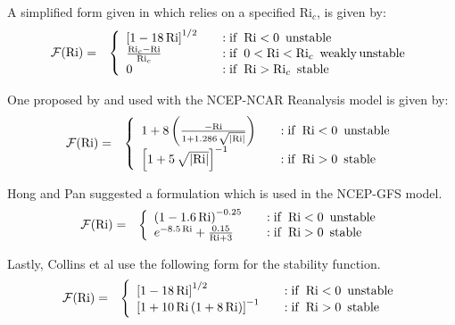 A simplified form given in \cite{Jacobson2005,Stull1988} which relies on a specified $\mathrm{Ri}_c$, is given by:
\begin{eqnarray}\label{VarDiff_Eq_F_Stull}
\mathcal{F}(\mathrm{Ri}) &=& \left\{ \begin{array} {l@{\quad \quad}l}
 \left[ 1 -18 \, \mathrm{Ri} \right]^{1/2}           &: \mathrm{if}\,\,\, \mathrm{Ri} < 0 \,\,\, \mathrm{unstable} \\
 \frac{\mathrm{Ri}_c-\mathrm{Ri}}{\mathrm{Ri}_c}     &: \mathrm{if}\,\,\, 0<\mathrm{Ri} < \mathrm{Ri}_c\,\,\, \mathrm{weakly \, unstable} \\
 0                                                   &: \mathrm{if}\,\,\, \mathrm{Ri} > \mathrm{Ri}_c \,\,\, \mathrm{stable}
\end{array}
\right.
\end{eqnarray}

One proposed by \cite{Betts1996} and used with the NCEP-NCAR Reanalysis model is given by:
\begin{eqnarray}\label{VarDiff_Eq_F_Betts}
\mathcal{F}(\mathrm{Ri}) &=& \left\{ \begin{array} {l@{\quad \quad}l}
 1 + 8 \left( \frac{- \mathrm{Ri}}{1+1.286 \, \sqrt{\left| \mathrm{Ri}\right|}} \right)  &: \mathrm{if}\,\,\, \mathrm{Ri} < 0 \,\,\, \mathrm{unstable} \\
 \left[ 1+ 5 \, \sqrt{\left| \mathrm{Ri}\right|} \right]^{-1}                            &: \mathrm{if}\,\,\, \mathrm{Ri} > 0 \,\,\, \mathrm{stable}
\end{array}
\right.
\end{eqnarray}

Hong and Pan \cite{Hong1996} suggested a formulation which is used in the NCEP-GFS model.
\begin{eqnarray}\label{VarDiff_Eq_F_Hong}
\mathcal{F}(\mathrm{Ri}) &=& \left\{ \begin{array} {l@{\quad \quad}l}
 \left(1 -1.6 \, \mathrm{Ri} \right)^{-0.25}                  &: \mathrm{if}\,\,\, \mathrm{Ri} < 0 \,\,\, \mathrm{unstable} \\
 e^{-8.5 \, \mathrm{Ri}} + \frac{0.15}{\mathrm{Ri} + 3}       &: \mathrm{if}\,\,\, \mathrm{Ri} > 0 \,\,\, \mathrm{stable}
\end{array}
\right.
\end{eqnarray}

Lastly, Collins et al \cite{Collins2004} use the following form for the stability function.
\begin{eqnarray}\label{VarDiff_Eq_F_Collins}
\mathcal{F}(\mathrm{Ri}) &=& \left\{ \begin{array} {l@{\quad \quad}l}
 \left[ 1 -18 \, \mathrm{Ri} \right]^{1/2}                         &: \mathrm{if}\,\,\, \mathrm{Ri} < 0 \,\,\, \mathrm{unstable} \\
 \left[ 1+ 10 \, \mathrm{Ri} \, (1+8 \, \mathrm{Ri}) \right]^{-1}  &: \mathrm{if}\,\,\, \mathrm{Ri} > 0 \,\,\, \mathrm{stable}
\end{array}
\right.
\end{eqnarray}

